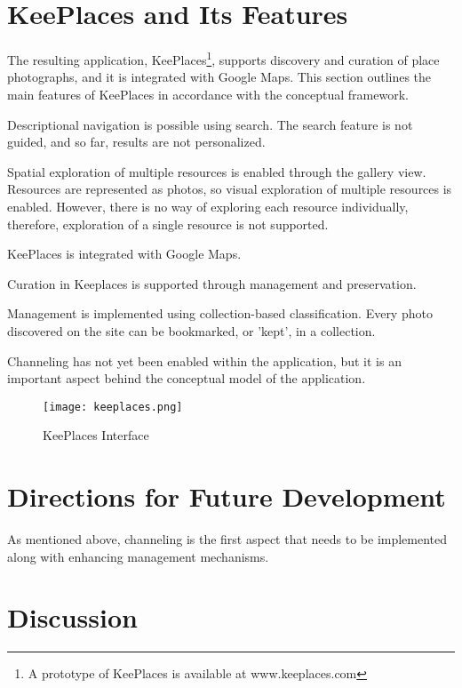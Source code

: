 {\section{KeePlaces and Its Features}
The resulting application, KeePlaces\footnote[1]{A prototype of KeePlaces is available at www.keeplaces.com}, supports discovery and curation of place photographs, and it is integrated with Google Maps. This section outlines the main features of KeePlaces in accordance with the conceptual framework. 

Descriptional navigation is possible using search. The search feature is not guided, and so far, results are not personalized. 


Spatial exploration of multiple resources is enabled through the gallery view. 
Resources are represented as photos, so visual exploration of multiple resources is enabled. However, there is no way of exploring each resource individually, therefore, exploration of a single resource is not supported. 

KeePlaces is integrated with Google Maps.

Curation in Keeplaces is supported through management and preservation.

Management is implemented using collection-based classification.
Every photo discovered on the site can be bookmarked, or 'kept', in a collection.

Channeling has not yet been enabled within the application, but it is an important aspect behind the conceptual model of the application.


\begin{figure}[ht!]
	\noindent
	\centering
	\texttt{[image: keeplaces.png]}
	\caption{KeePlaces Interface}
	\label{fig:keeplaces} 
\end{figure}
}
{\section{Directions for Future Development}
As mentioned above, channeling is the first aspect that needs to be implemented along with enhancing management mechanisms.

} %

{\section{Discussion}


} %




